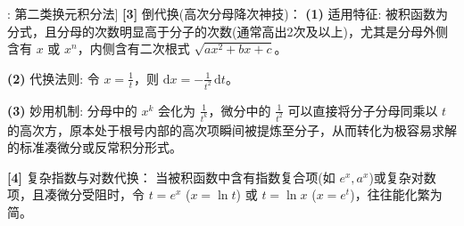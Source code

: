 \documentclass[11pt,a4paper,UTF8]{ctexart}
\begin{document}
\begin{thmbox}[方法[1]: 第二类换元积分法]
\textbf{[3]} 倒代换(高次分母降次神技)：
\textbf{(1)}  适用特征: 被积函数为分式，且分母的次数明显高于分子的次数(通常高出2次及以上)，尤其是分母外侧含有 $x$ 或 $x^n$，内侧含有二次根式 $\sqrt{ax^2+bx+c}$。

\textbf{(2)}  代换法则: 令 $x = \frac{1}{t}$，则 $\mathrm{d}x = -\frac{1}{t^2}\,\mathrm{d}t$。

\textbf{(3)}  妙用机制: 分母中的 $x^k$ 会化为 $\frac{1}{t^k}$，微分中的 $\frac{1}{t^2}$ 可以直接将分子分母同乘以 $t$ 的高次方，原本处于根号内部的高次项瞬间被提炼至分子，从而转化为极容易求解的标准凑微分或反常积分形式。

\textbf{[4]} 复杂指数与对数代换：
当被积函数中含有指数复合项(如 $e^x, a^x$)或复杂对数项，且凑微分受阻时，令 $t = e^x$ ($x = \ln t$) 或 $t = \ln x$ ($x = e^t$)，往往能化繁为简。

\end{thmbox}
\end{document}
